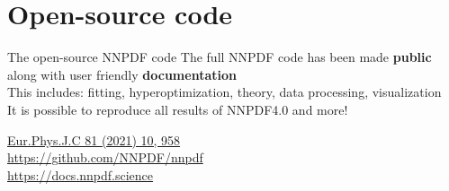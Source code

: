 \documentclass[aspectratio=169,9pt]{beamer}
\begin{document}







\section{Open-source code}
\begin{frame}[t]{The open-source NNPDF code}
    The full NNPDF code has been made \textbf{public} along with user friendly \textbf{documentation}\\
    \vspace*{1em}
    This includes: fitting, hyperoptimization, theory, data processing, visualization\\
    \vspace*{1em}
    It is possible to reproduce all results of NNPDF4.0 and more!\\
    \vspace*{2em}
    \begin{block}{}
        \centering
		\href{https://link.springer.com/article/10.1140/epjc/s10052-021-09747-9}{Eur.Phys.J.C 81 (2021) 10, 958} \\
		\url{https://github.com/NNPDF/nnpdf} \\
		\url{https://docs.nnpdf.science}
    \end{block}
    \vspace*{2em}
\end{frame}
\end{document}
